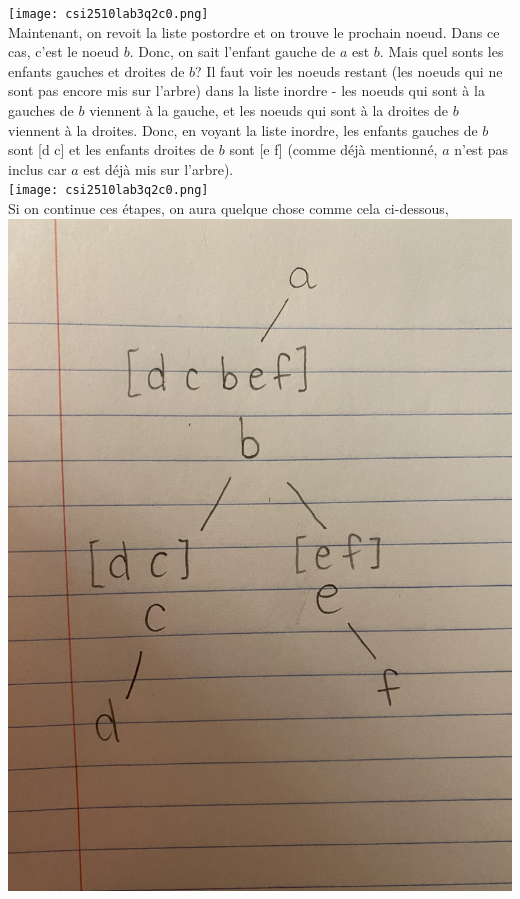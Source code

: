 \documentclass[12pt]{book}
\begin{document}
\begin{enumerate}
\begin{enumerate}
        \texttt{[image: csi2510lab3q2c0.png]}\\
        
        Maintenant, on revoit la liste postordre et on trouve le prochain noeud. Dans ce cas, c'est le noeud $b$. Donc, on sait l'enfant gauche de $a$ est $b$. Mais quel sonts les enfants gauches et droites de $b$? Il faut voir les noeuds restant (les noeuds qui ne sont pas encore mis sur l'arbre) dans la liste inordre - les noeuds qui sont à la gauches de $b$ viennent à la gauche, et les noeuds qui sont à la droites de $b$ viennent à la droites. Donc, en voyant la liste inordre, les enfants gauches de $b$ sont [d c] et les enfants droites de $b$ sont [e f] (comme déjà mentionné, $a$ n'est pas inclus car $a$ est déjà mis sur l'arbre).\\
        
        \texttt{[image: csi2510lab3q2c0.png]}\\
        \newpage
        Si on continue ces étapes, on aura quelque chose comme cela ci-dessous,\\
        
        \includegraphics[scale=0.05]{csi2510lab3q2c2.png}\\
        

\end{enumerate}
\end{enumerate}
\end{document}
